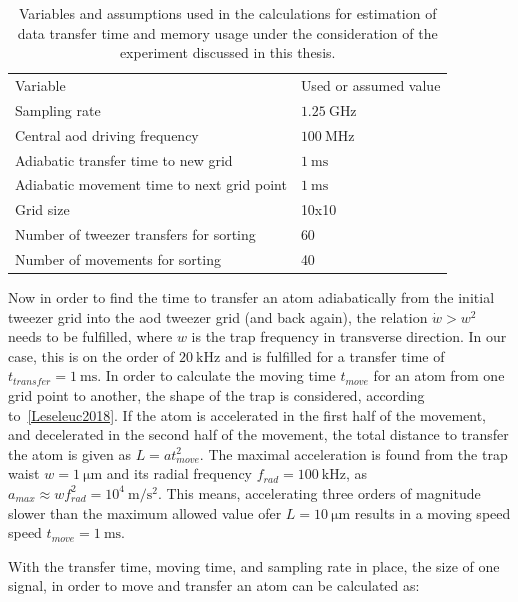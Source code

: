 \begin{table}[tb]
\label{tbl:spectrum_assumptions}
\centering
\begin{tabular}{l|l}
	\hline \hline
	Variable & Used or assumed value \\ \thickhline
	Sampling rate & $\SI{1.25}{\giga\hertz}$ \\
	Central \ac{aod} driving frequency & $\SI{100}{\mega\hertz}$ \\
	Adiabatic transfer time to new grid & $\SI{1}{\milli\second}$ \\
	Adiabatic movement time to next grid point & $\SI{1}{\milli\second}$ \\
	Grid size & 10x10 \\
	Number of tweezer transfers for sorting & 60 \\
	Number of movements for sorting & 40 \\
	\hline \hline
\end{tabular}
\caption{Variables and assumptions used in the calculations for estimation of data transfer time and memory usage under the consideration of the experiment discussed in this thesis.}
\end{table}

Now in order to find the time to transfer an atom adiabatically from the initial tweezer grid into the \ac{aod} tweezer grid (and back again), the relation $\dot{w} > w^2$ needs to be fulfilled, where $w$ is the trap frequency in transverse direction. In our case, this is on the order of $\SI{20}{\kilo\hertz}$ and is fulfilled for a transfer time of $t_{transfer} = \SI{1}{\milli\second}$. In order to calculate the moving time $t_{move}$ for an atom from one grid point to another, the shape of the trap is considered, according to~\ref{Leseleuc2018}. If the atom is accelerated in the first half of the movement, and decelerated in the second half of the movement, the total distance to transfer the atom is given as $L=a t_{move}^2$. The maximal acceleration is found from the trap waist $w = \SI{1}{\micro\meter}$ and its radial frequency $f_{rad} = \SI{100}{\kilo\hertz}$, as $a_{max} \approx w f_{rad}^2 = 10^4\SI{}{\meter\per\second\squared}$. This means, accelerating three orders of magnitude slower than the maximum allowed value ofer $L=\SI{10}{\micro\meter}$ results in a moving speed speed $t_{move} = \SI{1}{\milli\second}$.

With the transfer time, moving time, and sampling rate in place, the size of one signal, in order to move and transfer an atom can be calculated as:

